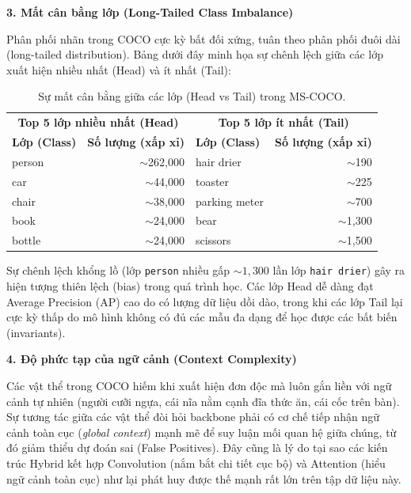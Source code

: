 \textbf{3. Mất cân bằng lớp (Long-Tailed Class Imbalance)}

Phân phối nhãn trong COCO cực kỳ bất đối xứng, tuân theo phân phối đuôi dài (long-tailed distribution). Bảng dưới đây minh họa sự chênh lệch giữa các lớp xuất hiện nhiều nhất (Head) và ít nhất (Tail):

\begin{table}[H]
\centering
\caption{Sự mất cân bằng giữa các lớp (Head vs Tail) trong MS-COCO.}
\label{tab:coco_imbalance}
\begin{tabular}{l r | l r}
\toprule
\multicolumn{2}{c|}{\textbf{Top 5 lớp nhiều nhất (Head)}} & \multicolumn{2}{c}{\textbf{Top 5 lớp ít nhất (Tail)}} \\
\textbf{Lớp (Class)} & \textbf{Số lượng (xấp xỉ)} & \textbf{Lớp (Class)} & \textbf{Số lượng (xấp xỉ)} \\
\midrule
person & $\sim$262{,}000 & hair drier & $\sim$190 \\
car & $\sim$44{,}000 & toaster & $\sim$225 \\
chair & $\sim$38{,}000 & parking meter & $\sim$700 \\
book & $\sim$24{,}000 & bear & $\sim$1{,}300 \\
bottle & $\sim$24{,}000 & scissors & $\sim$1{,}500 \\
\bottomrule
\end{tabular}
\end{table}

Sự chênh lệch khổng lồ (lớp \texttt{person} nhiều gấp $\sim 1{,}300$ lần lớp \texttt{hair drier}) gây ra hiện tượng thiên lệch (bias) trong quá trình học. Các lớp Head dễ dàng đạt Average Precision (AP) cao do có lượng dữ liệu dồi dào, trong khi các lớp Tail lại cực kỳ thấp do mô hình không có đủ các mẫu đa dạng để học được các bất biến (invariants).

\textbf{4. Độ phức tạp của ngữ cảnh (Context Complexity)}

Các vật thể trong COCO hiếm khi xuất hiện đơn độc mà luôn gắn liền với ngữ cảnh tự nhiên (người cưỡi ngựa, cái nĩa nằm cạnh đĩa thức ăn, cái cốc trên bàn). Sự tương tác giữa các vật thể đòi hỏi backbone phải có cơ chế tiếp nhận ngữ cảnh toàn cục (\textit{global context}) mạnh mẽ để suy luận mối quan hệ giữa chúng, từ đó giảm thiểu dự đoán sai (False Positives). Đây cũng là lý do tại sao các kiến trúc Hybrid kết hợp Convolution (nắm bắt chi tiết cục bộ) và Attention (hiểu ngữ cảnh toàn cục) như \fastvit{} lại phát huy được thế mạnh rất lớn trên tập dữ liệu này.

